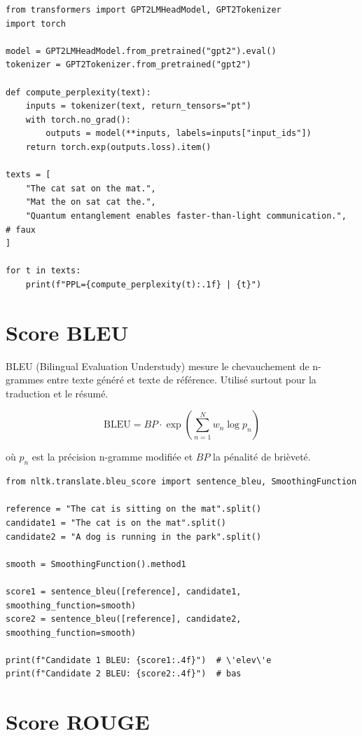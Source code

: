 \begin{verbatim}
from transformers import GPT2LMHeadModel, GPT2Tokenizer
import torch

model = GPT2LMHeadModel.from_pretrained("gpt2").eval()
tokenizer = GPT2Tokenizer.from_pretrained("gpt2")

def compute_perplexity(text):
    inputs = tokenizer(text, return_tensors="pt")
    with torch.no_grad():
        outputs = model(**inputs, labels=inputs["input_ids"])
    return torch.exp(outputs.loss).item()

texts = [
    "The cat sat on the mat.",
    "Mat the on sat cat the.",
    "Quantum entanglement enables faster-than-light communication.",  # faux
]

for t in texts:
    print(f"PPL={compute_perplexity(t):.1f} | {t}")
\end{verbatim}

\section{Score BLEU}

BLEU (Bilingual Evaluation Understudy) mesure le chevauchement de n-grammes entre texte g\'en\'er\'e et texte de r\'ef\'erence. Utilis\'e surtout pour la traduction et le r\'esum\'e.

\[
\text{BLEU} = BP \cdot \exp\left(\sum_{n=1}^{N} w_n \log p_n\right)
\]

o\`u $p_n$ est la pr\'ecision n-gramme modifi\'ee et $BP$ la p\'enalit\'e de bri\`evet\'e.

\begin{verbatim}
from nltk.translate.bleu_score import sentence_bleu, SmoothingFunction

reference = "The cat is sitting on the mat".split()
candidate1 = "The cat is on the mat".split()
candidate2 = "A dog is running in the park".split()

smooth = SmoothingFunction().method1

score1 = sentence_bleu([reference], candidate1, smoothing_function=smooth)
score2 = sentence_bleu([reference], candidate2, smoothing_function=smooth)

print(f"Candidate 1 BLEU: {score1:.4f}")  # \'elev\'e
print(f"Candidate 2 BLEU: {score2:.4f}")  # bas
\end{verbatim}

\section{Score ROUGE}

